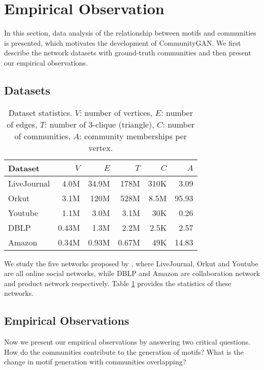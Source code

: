 \documentclass[sigconf]{acmart}
\begin{document}
\section{Empirical Observation}
In this section, data analysis of the relationship between motifs and communities is presented, which motivates the development of CommunityGAN.
We first describe the network datasets with ground-truth communities and then present our empirical observations.



\subsection{Datasets}

\begin{table}[]
\centering
\caption{Dataset statistics. $V$: number of vertices, $E$: number of edges, $T$: number of 3-clique (triangle), $C$: number of communities, $A$: community memberships per vertex.}
\label{tab:observation-statistics}
\begin{tabular}{l||r|r|r|r|r}
Dataset      & $V$    & $E$    & $T$    & $C$   & $A$   \\
\hline
\hline
LiveJournal  & 4.0M   & 34.9M  & 178M   & 310K  & 3.09  \\
Orkut        & 3.1M   & 120M   & 528M   & 8.5M  & 95.93 \\
Youtube      & 1.1M   & 3.0M   & 3.1M   & 30K   & 0.26  \\
DBLP         & 0.43M  & 1.3M   & 2.2M   & 2.5K  & 2.57  \\
Amazon       & 0.34M  & 0.93M  & 0.67M  & 49K   & 14.83
\end{tabular}
\end{table}

We study the five networks proposed by \citet{yang2012community}, where
LiveJournal, Orkut and Youtube are all online social networks, while
DBLP and Amazon are collaboration network and product network respectively.
Table \ref{tab:observation-statistics} provides the statistics of these networks.


\subsection{Empirical Observations}
Now we present our empirical observations by answering two critical questions.
How do the communities contribute to the generation of motifs?
What is the change in motif generation with communities overlapping?
\end{document}
